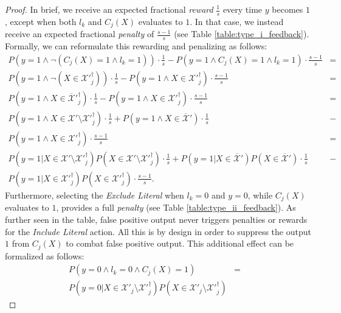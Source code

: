 \documentclass[11pt,a4paper]{article}
\newcommand{\True}{\mbox{1}}
\newcommand{\False}{\mbox{0}}
\begin{document}
\begin{proof}
In brief, we receive an expected fractional \emph{reward} $\frac{1}{s}$ every time $y$ becomes $\True$, except when both $l_k$ and $C_j(X)$ evaluates to $\True$. In that case, we instead receive an expected fractional \emph{penalty} of $\frac{s-1}{s}$ (see Table \ref{table:type_i_feedback}). Formally, we can reformulate this rewarding and penalizing as follows:
\begin{eqnarray}
P(y = \True \land \lnot (C_j(X) = \True \land l_k = \True))\cdot \frac{1}{s} - P(y = \True \land C_j(X) = \True \land l_k = \True) \cdot \frac{s-1}{s} &=&\\
P(y = \True \land \lnot (X \in \mathcal{X}'^{\dagger}_j)) \cdot \frac{1}{s} - P(y = \True \land X \in \mathcal{X}'^{\dagger}_j) \cdot \frac{s-1}{s} &=&\\
P(y = \True \land X \in \overline{\mathcal{X}}'^{\dagger}_j) \cdot \frac{1}{s} - P(y = \True \land X \in \mathcal{X}'^{\dagger}_j) \cdot \frac{s-1}{s}&=&\\
P(y = \True \land X \in \mathcal{X}' \setminus \mathcal{X}'^{\dagger}_j) \cdot \frac{1}{s} + P(y = \True \land X \in \overline{\mathcal{X}}') \cdot \frac{1}{s} &-&\nonumber\\
P(y = \True \land X \in \mathcal{X}'^{\dagger}_j) \cdot \frac{s-1}{s}&=&\\
P(y = \True | X \in \mathcal{X}' \setminus \mathcal{X}'^{\dagger}_j) P(X \in \mathcal{X}' \setminus \mathcal{X}'^{\dagger}_j) \cdot \frac{1}{s} + P(y = \True | X \in \overline{\mathcal{X}}') P(X \in \overline{\mathcal{X}}') \cdot \frac{1}{s}
 &-&\nonumber\\
P(y = \True | X \in \mathcal{X}'^{\dagger}_j)P(X \in \mathcal{X}'^{\dagger}_j) \cdot \frac{s-1}{s}.
\end{eqnarray}
Furthermore, selecting the  \emph{Exclude Literal} when $l_k = \False$ and $y=\False$, while $C_j(X)$ evaluates to $\True$, provides a full \emph{penalty} (see Table \ref{table:type_ii_feedback}). As further seen in the table, false positive output never triggers penalties or rewards for the \emph{Include Literal} action. All this is by design in order to suppress the output $\True$ from $C_j(X)$ to combat false positive output. This additional effect can be formalized as follows:
\begin{eqnarray}
P(y = \False \land l_k = \False \land C_j(X) = \True)&=&\\
P(y = \False | X \in \mathcal{X}'_j \setminus \mathcal{X}'^{\dagger}_j) P(X \in \mathcal{X}'_j \setminus \mathcal{X}'^{\dagger}_j)
\end{eqnarray}
\end{proof}
\end{document}
